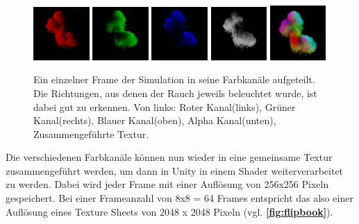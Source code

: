 \begin{figure}[h!]
	\centering
	\includegraphics[width=0.19\textwidth]{Grafiken/Implementation/Lightmaps/T1_R.png}
	\includegraphics[width=0.19\textwidth]{Grafiken/Implementation/Lightmaps/T1_G.png}
	\includegraphics[width=0.19\textwidth]{Grafiken/Implementation/Lightmaps/T1_B.png}
	\includegraphics[width=0.19\textwidth]{Grafiken/Implementation/Lightmaps/T1_A.png}
	\includegraphics[width=0.19\textwidth]{Grafiken/Implementation/Lightmaps/merged.png}

	\begin{footnotesize}
		\caption{Ein einzelner Frame der Simulation in seine Farbkanäle aufgeteilt. Die Richtungen, aus denen der Rauch jeweils beleuchtet wurde, ist dabei gut zu erkennen.
			Von links: Roter Kanal(links), Grüner Kanal(rechts), Blauer Kanal(oben), Alpha Kanal(unten), Zusammengeführte Textur.}
		\label{fig:lightDirections}
	\end{footnotesize}
\end{figure}


Die verschiedenen Farbkanäle können nun wieder in eine gemeinsame Textur zusammengeführt werden, um dann in Unity in einem Shader weiterverarbeitet zu werden.
Dabei wird jeder Frame mit einer Auflösung von 256x256 Pixeln gespeichert. Bei einer Frameanzahl von 8x8 = 64 Frames entspricht das also
einer Auflösung eines Texture Sheets von 2048 x 2048 Pixeln (vgl. \textbf{\autoref{fig:flipbook}}).


